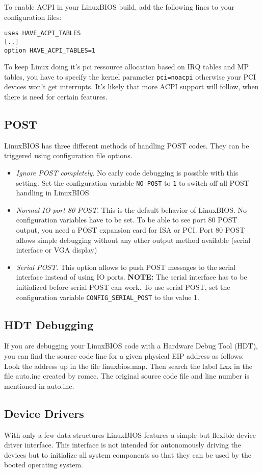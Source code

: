 \documentclass[titlepage,12pt]{article}
\begin{document}
To enable ACPI in your LinuxBIOS build, add the following lines to your
configuration files:
\begin{verbatim}
uses HAVE_ACPI_TABLES
[..]
option HAVE_ACPI_TABLES=1
\end{verbatim}

To keep Linux doing it's pci ressource allocation based on IRQ tables and MP
tables, you have to specify the kernel parameter \texttt{pci=noacpi} otherwise
your PCI devices won't get interrupts. 
It's likely that more ACPI support will follow, when there is need for certain
features.

\subsection{POST}
LinuxBIOS has three different methods of handling POST codes. They can
be triggered using configuration file options.
\begin{itemize}
\item
\emph{Ignore POST completely}. No early code debugging is possible with
this setting.  Set the configuration variable \texttt{NO\_POST} to
\texttt{1} to switch off all POST handling in LinuxBIOS.
\item
\emph{Normal IO port 80 POST}. This is the default behavior of
LinuxBIOS. No configuration variables have to be set. To be able to see
port 80 POST output, you need a POST expansion card for ISA or PCI. Port
80 POST allows simple debugging without any other output method
available (serial interface or VGA display)
\item
\emph{Serial POST}. 
This option allows to push POST messages to the serial interface instead
of using IO ports. \textbf{NOTE:} The serial interface has to be
initialized before serial POST can work. To use serial POST, set the
configuration variable \texttt{CONFIG\_SERIAL\_POST} to the value 1.
\end{itemize}


\subsection{HDT Debugging}
If you are debugging your LinuxBIOS code with a Hardware Debug Tool
(HDT), you can find the source code line for a given physical EIP
address as follows: Look the address up in the file linuxbios.map. Then
search the label Lxx in the file auto.inc created by romcc. The original
source code file and line number is mentioned in auto.inc.


\subsection{Device Drivers}
With only a few data structures LinuxBIOS features a simple but flexible
device driver interface. This interface is not intended for autonomously
driving the devices but to initialize all system components so that they
can be used by the booted operating system.
\end{document}
